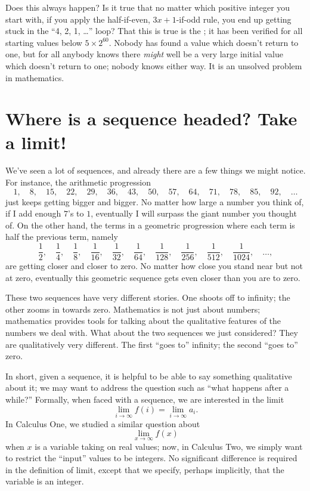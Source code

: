 Does this always happen?  Is it true that no matter which positive
integer you start with, if you apply the half-if-even, $3x+1$-if-odd
rule, you end up getting stuck in the ``4, 2, 1, \ldots'' loop?  That
this is true is the ; it has been
verified for all starting values below $5 \times 2^{60}$.  Nobody has
found a value which doesn't return to one, but for all anybody knows
there \textit{might} well be a very large initial value which doesn't
return to one; nobody knows either way.  It is an unsolved
problem in mathematics.

\section{Where is a sequence headed?  Take a limit!}
\label{section:limits}

We've seen a lot of sequences, and already there are a few things we
might notice.  For instance, the arithmetic progression
$$
1,\quad 8,\quad 15,\quad 22,\quad 29,\quad 36,\quad 43,\quad 50,\quad 57,\quad 64,\quad 71,\quad 78,\quad 85,\quad 92,\quad \ldots
$$
just keeps getting bigger and bigger.  No matter how large a number
you think of, if I add enough $7$'s to $1$, eventually I will surpass
the giant number you thought of.  On the other hand, the terms in a geometric progression where each term is half the previous term, namely
$$
\frac{1}{2},\quad \frac{1}{4},\quad \frac{1}{8},\quad \frac{1}{16},\quad \frac{1}{32},\quad \frac{1}{64},\quad \frac{1}{128},\quad \frac{1}{256},\quad \frac{1}{512},\quad \frac{1}{1024},\quad \ldots ,
$$
are getting closer and closer to zero.  No matter how close you stand
near but not at zero, eventually this geometric sequence gets even closer than you
are to zero.

These two sequences have very different stories.  One shoots off to
infinity; the other zooms in towards zero.  Mathematics is not just
about numbers; mathematics provides tools for talking about the
qualitative features of the numbers we deal with.  What about the two
sequences we just considered?  They are qualitatively very different.  The first ``goes to''
infinity; the second ``goes to'' zero.


In short, given a sequence, it is helpful to be able to say something
qualitative about it; we may want to address the question such as
``what happens after a while?'' Formally, when faced with a sequence,
we are interested in the limit
$$\lim_{i\to \infty} f(i) = \lim_{i\to\infty} a_i.$$
In Calculus One, we studied a similar question about
$$\lim_{x\to\infty} f(x)$$
when $x$ is a variable taking on real values; now, in Calculus Two, we
simply want to restrict the ``input'' values to be integers. No
significant difference is required in the definition of limit, except
that we specify, perhaps implicitly, that the variable is an integer.

